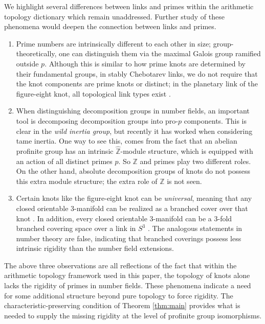 \documentclass{amsart}
\theoremstyle{plain}
\theoremstyle{definition}
\theoremstyle{plain}
\theoremstyle{plain}
\theoremstyle{plain}
\theoremstyle{remark}
\theoremstyle{remark}
\theoremstyle{plain}
\theoremstyle{definition}
\theoremstyle{plain}
\newcounter{main}
\theoremstyle{plain}
\theoremstyle{plain}
\numberwithin{equation}{section}
\begin{document}
We highlight several differences between links and primes within the arithmetic topology dictionary which remain unaddressed. Further study of these phenomena would deepen the connection between links and primes. 

\begin{enumerate}
    \item Prime numbers are intrinsically different to each other in size; group-theoretically, one can distinguish them via the maximal Galois group ramified outside $p$. Although this is similar to how prime knots are determined by their fundamental groups, in stably Chebotarev links, we do not require that the knot components are prime knots or distinct; in the planetary link of the figure-eight knot, all topological link types exist \cite{ghrist}.
    \item  When distinguishing decomposition groups in number fields, an important tool is decomposing decomposition groups into pro-$p$ components. This is clear in the \emph{wild inertia group}, but recently \cite{karshon2026pro} it has worked when considering tame inertia. One way to see this, comes from the fact that an abelian profinite group has an intrinsic $\widehat{\mathbb{Z}}$-module structure, which is equipped with an action of all distinct primes $p$. So $\mathbb{Z}$ and primes play two different roles. On the other hand, absolute decomposition groups of knots do not possess this extra module structure; the extra role of $\mathbb{Z}$ is not seen. 
    \item Certain knots like the figure-eight knot can be \emph{universal}, meaning that any closed orientable 3-manifold can be realized as a branched cover over that knot \cite{hilden}. In addition, every closed orientable 3-manifold can be a 3-fold branched covering space over a link in $S^3$ \cite{hilden3fold}. The analogous statements in number theory are false, indicating that branched coverings possess less intrinsic rigidity than the number field extensions. 
\end{enumerate} 

The above three observations are all reflections of the fact that within the arithmetic topology framework used in this paper, the topology of knots alone lacks the rigidity of primes in number fields. These phenomena indicate a need for some additional structure beyond pure topology to force rigidity. The characteristic-preserving condition of Theorem \ref{thm:main} provides what is needed to supply the missing rigidity at the level of profinite group isomorphisms. 
\end{document}
